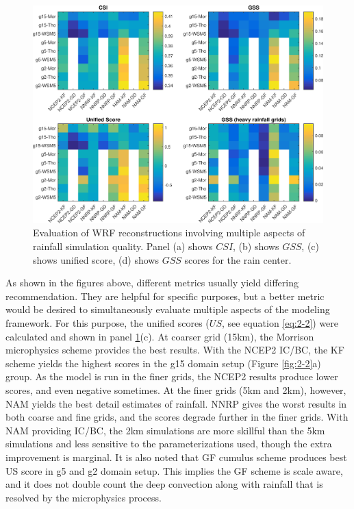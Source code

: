 \begin{figure}[htbp]
  \includegraphics[width=\linewidth]{pics/ch2/fig6.jpg}
  \caption{Evaluation of WRF reconstructions involving multiple aspects of rainfall simulation quality. Panel (a) shows $CSI$, (b) shows $GSS$, (c) shows unified score, (d) shows $GSS$ scores for the rain center.}
  \label{fig:2-6}
\end{figure}

As shown in the figures above, different metrics usually yield differing recommendation. They are helpful for specific purposes, but a better metric would be desired to simultaneously evaluate multiple aspects of the modeling framework. For this purpose, the unified scores ($US$, see equation \ref{eq:2-2}) were calculated and shown in panel \ref{fig:2-6}(c). At coarser grid (15km), the Morrison microphysics scheme provides the best results. With the NCEP2 IC/BC, the KF scheme yields the highest scores in the g15 domain setup (Figure \ref{fig:2-2}a) group. As the model is run in the finer grids, the NCEP2 results produce lower scores, and even negative sometimes. At the finer grids (5km and 2km), however, NAM yields the best detail estimates of rainfall. NNRP gives the worst results in both coarse and fine grids, and the scores degrade further in the finer grids. With NAM providing IC/BC, the 2km simulations are more skillful than the 5km simulations and less sensitive to the parameterizations used, though the extra improvement is marginal. It is also noted that GF cumulus scheme produces best US score in g5 and g2 domain setup. This implies the GF scheme is scale aware, and it does not double count the deep convection along with rainfall that is resolved by the microphysics process.

